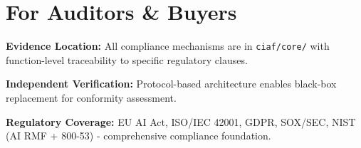 \documentclass[11pt,a4paper]{article}
\begin{document}
\section*{For Auditors \& Buyers}

\textbf{Evidence Location:} All compliance mechanisms are in \texttt{ciaf/core/} with function-level traceability to specific regulatory clauses.

\textbf{Independent Verification:} Protocol-based architecture enables black-box replacement for conformity assessment.

\textbf{Regulatory Coverage:} EU AI Act, ISO/IEC 42001, GDPR, SOX/SEC, NIST (AI RMF + 800-53) - comprehensive compliance foundation.
\end{document}
